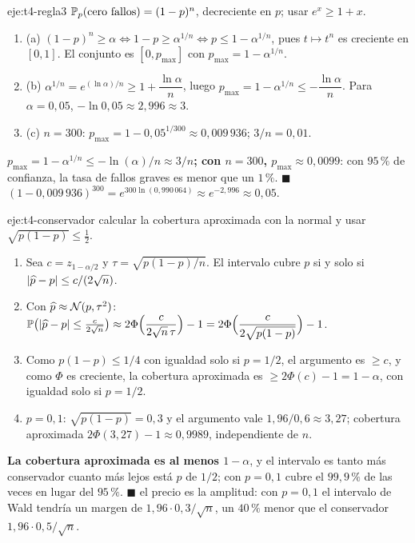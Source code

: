 \begin{solucion}{eje:t4-regla3}
\planteamiento $\mathbb{P}_p(\text{cero fallos})=(1-p)^{n}$, decreciente en $p$; usar $e^{x}\ge1+x$.
\pasos
\begin{enumerate}[label=\arabic*.]
  \item (a) $(1-p)^{n}\ge\alpha\iff1-p\ge\alpha^{1/n}\iff p\le1-\alpha^{1/n}$, pues $t\mapsto t^{n}$ es creciente en $[0,1]$. El conjunto es $[0,p_{\max}]$ con $p_{\max}=1-\alpha^{1/n}$.
  \item (b) $\alpha^{1/n}=e^{(\ln\alpha)/n}\ge1+\dfrac{\ln\alpha}{n}$, luego $p_{\max}=1-\alpha^{1/n}\le-\dfrac{\ln\alpha}{n}$. Para $\alpha=0{,}05$, $-\ln0{,}05\approx2{,}996\approx3$.
  \item (c) $n=300$: $p_{\max}=1-0{,}05^{1/300}\approx0{,}009\,936$; $3/n=0{,}01$.
\end{enumerate}
\resultado \textbf{$p_{\max}=1-\alpha^{1/n}\le-\ln(\alpha)/n\approx3/n$; con $n=300$, $p_{\max}\approx0{,}0099$}: con $95\,\%$ de confianza, la tasa de fallos graves es menor que un $1\,\%$. $\blacksquare$
\comprobacion $(1-0{,}009\,936)^{300}=e^{300\ln(0{,}990\,064)}\approx e^{-2{,}996}\approx0{,}05$.
\end{solucion}

\begin{solucion}{eje:t4-conservador}
\planteamiento calcular la cobertura aproximada con la normal y usar $\sqrt{p(1-p)}\le\frac12$.
\pasos
\begin{enumerate}[label=\arabic*.]
  \item Sea $c=z_{1-\alpha/2}$ y $\tau=\sqrt{p(1-p)/n}$. El intervalo cubre $p$ si y solo si $\lvert\widehat p-p\rvert\le c/(2\sqrt n)$.
  \item Con $\widehat p\approx\mathcal{N}(p,\tau^{2})$: $\mathbb{P}\bigl(\lvert\widehat p-p\rvert\le\tfrac{c}{2\sqrt n}\bigr)\approx2\Phi\Bigl(\dfrac{c}{2\sqrt n\,\tau}\Bigr)-1=2\Phi\Bigl(\dfrac{c}{2\sqrt{p(1-p)}}\Bigr)-1$.
  \item Como $p(1-p)\le1/4$ con igualdad solo si $p=1/2$, el argumento es $\ge c$, y como $\Phi$ es creciente, la cobertura aproximada es $\ge2\Phi(c)-1=1-\alpha$, con igualdad solo si $p=1/2$.
  \item $p=0{,}1$: $\sqrt{p(1-p)}=0{,}3$ y el argumento vale $1{,}96/0{,}6\approx3{,}27$; cobertura aproximada $2\Phi(3{,}27)-1\approx0{,}9989$, independiente de $n$.
\end{enumerate}
\resultado \textbf{La cobertura aproximada es al menos $1-\alpha$}, y el intervalo es tanto más conservador cuanto más lejos está $p$ de $1/2$; con $p=0{,}1$ cubre el $99{,}9\,\%$ de las veces en lugar del $95\,\%$. $\blacksquare$
\comprobacion el precio es la amplitud: con $p=0{,}1$ el intervalo de Wald tendría un margen de $1{,}96\cdot0{,}3/\sqrt n$, un $40\,\%$ menor que el conservador $1{,}96\cdot0{,}5/\sqrt n$.
\end{solucion}

